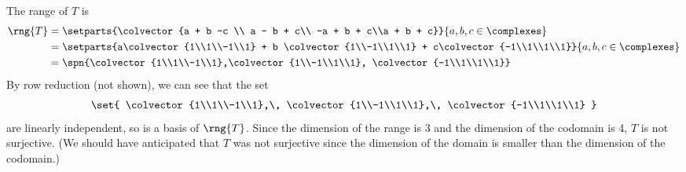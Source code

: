 The range of $T$ is 
\begin{align*}
\rng{T} 
&= \setparts{\colvector{a + b -c \\ a - b + c\\ -a + b + c\\a + b + c}}{a,b,c\in\complexes}\\
&= \setparts{a\colvector{1\\1\\-1\\1} + b \colvector{1\\-1\\1\\1} + c\colvector{-1\\1\\1\\1}}{a,b,c\in\complexes}\\
&= \spn{\colvector{1\\1\\-1\\1},\colvector{1\\-1\\1\\1}, \colvector{-1\\1\\1\\1}}
\end{align*}
By row reduction (not shown), we can see that the set
%
\begin{align*}
\set{
\colvector{1\\1\\-1\\1},\,
\colvector{1\\-1\\1\\1},\,
\colvector{-1\\1\\1\\1}
}
\end{align*}
% 
are linearly independent, so is a basis of $\rng{T}$.  Since the dimension of the range is 3 and the dimension of the codomain is 4, $T$ is not surjective.  (We should have anticipated that $T$ was not surjective since the dimension of the domain is smaller than the dimension of the codomain.) 